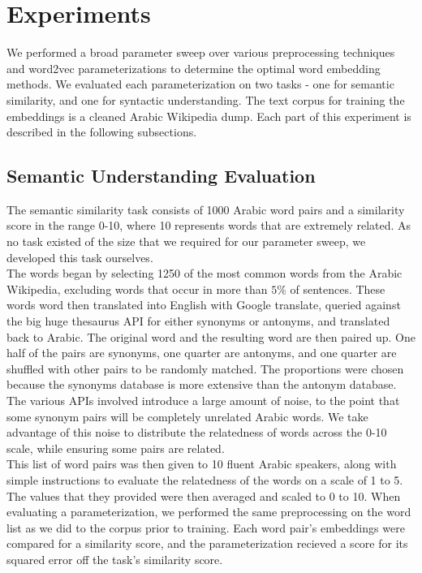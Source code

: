 \section{Experiments}

We performed a broad parameter sweep over various preprocessing techniques and word2vec parameterizations to determine the optimal word embedding methods. We evaluated each parameterization on two tasks - one for semantic similarity, and one for syntactic understanding. The text corpus for training the embeddings is a cleaned Arabic Wikipedia dump. Each part of this experiment is described in the following subsections.

\subsection{Semantic Understanding Evaluation}

The semantic similarity task consists of 1000 Arabic word pairs and a similarity score in the range 0-10, where 10 represents words that are extremely related. As no task existed of the size that we required for our parameter sweep, we developed this task ourselves. 
\\
The words began by selecting 1250 of the most common words from the Arabic Wikipedia, excluding words that occur in more than $5\%$ of sentences. These words word then translated into English with Google translate, queried against the big huge thesaurus API for either synonyms or antonyms, and translated back to Arabic. The original word and the resulting word are then paired up. One half of the pairs are synonyms, one quarter are antonyms, and one quarter are shuffled with other pairs to be randomly matched. The proportions were chosen because the synonyms database is more extensive than the antonym database. The various APIs involved introduce a large amount of noise, to the point that some synonym pairs will be completely unrelated Arabic words. We take advantage of this noise to distribute the relatedness of words across the 0-10 scale, while ensuring some pairs are related.
\\
This list of word pairs was then given to 10 fluent Arabic speakers, along with simple instructions to evaluate the relatedness of the words on a scale of 1 to 5. The values that they provided were then averaged and scaled to 0 to 10. When evaluating a parameterization, we performed the same preprocessing on the word list as we did to the corpus prior to training. Each word pair's embeddings were compared for a similarity score, and the parameterization recieved a score for its squared error off the task's similarity score.

